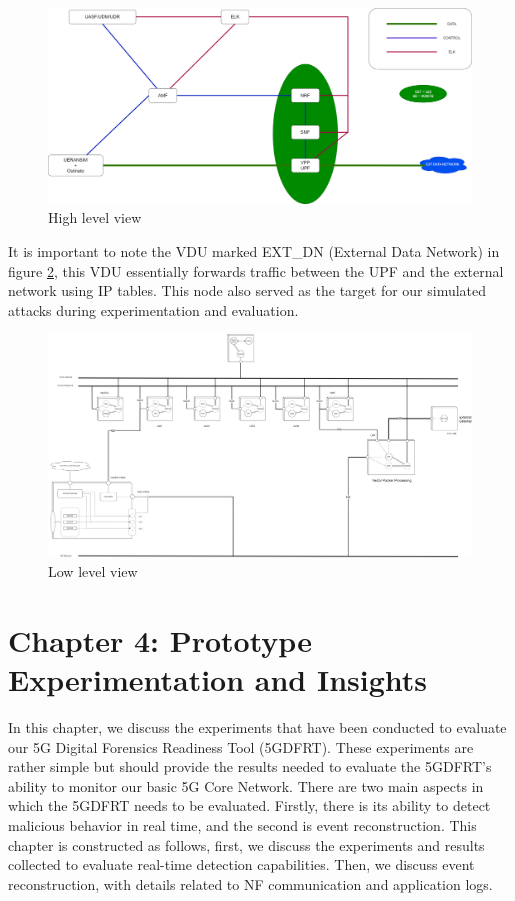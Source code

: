 \documentclass[final,1p,times,authoryear]{elsarticle}
\begin{document}
\begin{figure}[H]
  \centering
  \includegraphics[width=\textwidth, height=\textheight, keepaspectratio]{diagrams/V6_Config_HL.png}
  \caption{High level view}
  \label{fig:hl_config}
\end{figure}
It is important to note the VDU marked EXT\_DN (External Data Network) in figure \ref{fig:ll_config}, this VDU essentially forwards traffic between the UPF and the external network using IP tables. This node also served as the target for our simulated attacks during experimentation and evaluation.
\begin{figure}[H]
  \centering
  \includegraphics[angle=90, width=1.05\textwidth, height=1.05\textheight, keepaspectratio]{diagrams/Final_Config_LL.png}
  \caption{Low level view}
  \label{fig:ll_config}
\end{figure}
\newpage

\section{Chapter 4: Prototype Experimentation and Insights}
\label{sec4}
In this chapter, we discuss the experiments that have been conducted to evaluate our 5G Digital Forensics Readiness Tool (5GDFRT). These experiments are rather simple but should provide the results needed to evaluate the 5GDFRT's ability to monitor our basic 5G Core Network. There are two main aspects in which the 5GDFRT needs to be evaluated. Firstly, there is its ability to detect malicious behavior in real time, and the second is event reconstruction. This chapter is constructed as follows, first, we discuss the experiments and results collected to evaluate real-time detection capabilities. Then, we discuss event reconstruction, with details related to NF communication and application logs.
\end{document}
